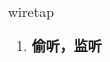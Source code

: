 
\begin{frame}
{\huge wiretap}
\begin{center}
\begin{enumerate}\Large
  \item \textbf{偷听，监听}
\end{enumerate}
\end{center}
\end{frame}
